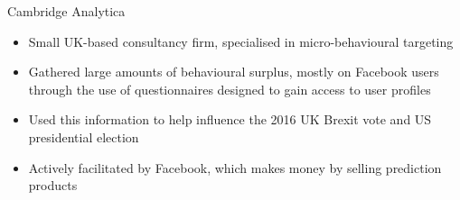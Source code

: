 \documentclass[aspectratio=169]{beamer}
\begin{document}
    {%
    \begin{frame}{Cambridge Analytica}
        \begin{itemize}
            \item Small UK-based consultancy firm, specialised in
                \alert{micro-behavioural targeting}
            \item Gathered large amounts of behavioural surplus, mostly on
                Facebook users through the use of questionnaires designed to
                gain access to user profiles
            \item Used this information to help influence the 2016 UK Brexit
                vote and US presidential election
            \pause{}
            \item Actively facilitated by Facebook, which makes money by
                selling prediction products
        \end{itemize}
    \end{frame}
    }
\end{document}
